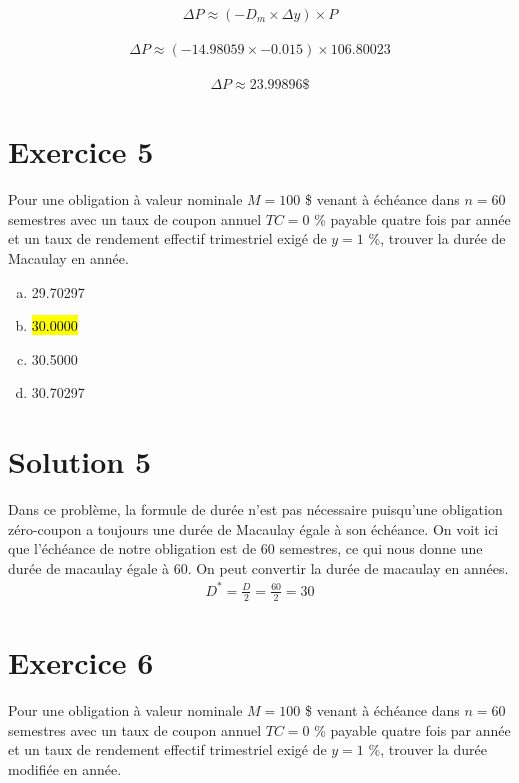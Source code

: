 \documentclass[10pt,a4paper]{article}
\begin{document}
\begin{align*}
\Delta P \approx (-D_m \times \Delta y) \times P
\end{align*}

\begin{align*}
\Delta P \approx (-14.98059 \times -0.015) \times 106.80023
\end{align*}

\begin{align*}
\Delta P \approx 23.99896\$
\end{align*}

\newpage

\section*{Exercice 5}
Pour une obligation à valeur nominale $M = 100$ \$ venant à échéance dans $n = 60$ semestres avec un taux de coupon annuel $TC = 0$ \% payable quatre fois par année et un taux de rendement effectif trimestriel exigé de $y = 1$ \%,  trouver la durée de Macaulay en année.


\begin{enumerate}[a)]
\item 29.70297 
\item \hl{30.0000}
\item 30.5000
\item 30.70297 
\end{enumerate}

\section*{Solution 5}
Dans ce problème, la formule de durée n'est pas nécessaire puisqu'une obligation zéro-coupon a toujours une durée de Macaulay égale à son échéance. On voit ici que l'échéance de notre obligation est de 60 semestres, ce qui nous donne une durée de macaulay égale à 60.  On peut convertir la durée de macaulay en années.
\begin{align*}
D^*=\frac{D}{2}=\frac{60}{2}=30
\end{align*}


\newpage


\section*{Exercice 6}
Pour une obligation à valeur nominale $M = 100$ \$ venant à échéance dans $n = 60$ semestres avec un taux de coupon annuel $TC = 0$ \% payable quatre fois par année et un taux de rendement effectif trimestriel exigé de $y = 1$ \%,  trouver la durée modifiée en année.
\end{document}
